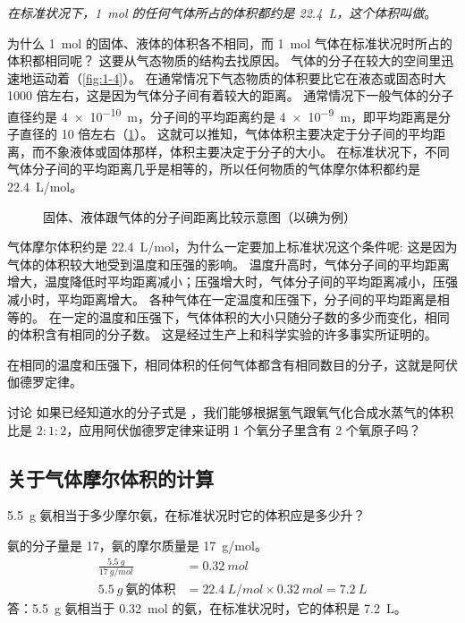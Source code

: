 \emph{在标准状况下，\qty{1}{mol} 的任何气体所占的体积都约是 \qty{22.4}{L}，这个体积叫做}。

为什么 \qty{1}{mol} 的固体、液体的体积各不相同，而 \qty{1}{mol} 气体在标准状况时所占的体积都相同呢？ 
这要从气态物质的结构去找原因。
气体的分子在较大的空间里迅速地运动着（\cref{fig:1-4}）。
在通常情况下气态物质的体积要比它在液态或固态时大 1000 倍左右，这是因为气体分子间有着较大的距离。
通常情况下一般气体的分子直径约是 \qty{4e-10}{m}，分子间的平均距离约是 \qty{4e-9}{m}，即平均距离是分子直径的 10 倍左右（\cref{fig:1-5}）。
这就可以推知，气体体积主要决定于分子间的平均距离，而不象液体或固体那样，体积主要决定于分子的大小。
在标准状况下，不同气体分子间的平均距离几乎是相等的，所以任何物质的气体摩尔体积都约是 \qty{22.4}{L/mol}。
\begin{figure}
  \caption{固体、液体跟气体的分子间距离比较示意图（以碘为例）}\label{fig:1-5}
\end{figure}

气体摩尔体积约是 \qty{22.4}{L/mol}，为什么一定要加上标准状况这个条件呢: 这是因为气体的体积较大地受到温度和压强的影响。
温度升高时，气体分子间的平均距离增大，温度降低时平均距离减小；压强增大时，气体分子间的平均距离减小，压强减小时，平均距离增大。
各种气体在一定温度和压强下，分子间的平均距离是相等的。
在一定的温度和压强下，气体体积的大小只随分子数的多少而变化，相同的体积含有相同的分子数。
这是经过生产上和科学实验的许多事实所证明的。

在相同的温度和压强下，相同体积的任何气体都含有相同数目的分子，这就是阿伏伽德罗定律。

\begin{Theorem}{讨论}
如果已经知道水的分子式是 ，我们能够根据氢气跟氧气化合成水蒸气的体积比是 $2:1:2$，应用阿伏伽德罗定律来证明 1 个氧分子里含有 2 个氧原子吗？
\end{Theorem}

\subsection{关于气体摩尔体积的计算}
\begin{example}
  \qty{5.5}{g} 氨相当于多少摩尔氨，在标准状况时它的体积应是多少升？
\end{example}
\begin{solution}
  氨的分子量是 17，氨的摩尔质量是 \qty{17}{g/mol}。
  \[\begin{split} 
    \frac{\qty{5.5}{g}}{\qty{17}{g/mol}} &= \qty{0.32}{mol} \\
    \qty{5.5}{g}\ \text{氨的体积} & = \qty{22.4}{L/mol} \times \qty{0.32}{mol} =\qty{7.2}{L}
  \end{split}\]
  答：\qty{5.5}{g} 氨相当于 \qty{0.32}{mol} 的氨，在标准状况时，它的体积是 \qty{7.2}{L}。
\end{solution}

